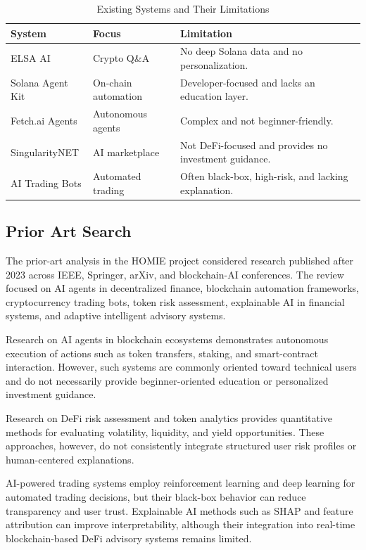 \documentclass[conference]{IEEEtran}
\begin{document}
\begin{table}[t]
\caption{Existing Systems and Their Limitations}
\label{tab:existing}
\centering
\small
\begin{tabularx}{\columnwidth}{l l X}
\toprule
\textbf{System} & \textbf{Focus} & \textbf{Limitation}\\
\midrule
ELSA AI & Crypto Q\&A & No deep Solana data and no personalization.\\
Solana Agent Kit & On-chain automation & Developer-focused and lacks an education layer.\\
Fetch.ai Agents & Autonomous agents & Complex and not beginner-friendly.\\
SingularityNET & AI marketplace & Not DeFi-focused and provides no investment guidance.\\
AI Trading Bots & Automated trading & Often black-box, high-risk, and lacking explanation.\\
\bottomrule
\end{tabularx}
\end{table}

\subsection{Prior Art Search}

The prior-art analysis in the HOMIE project considered research published after 2023 across IEEE, Springer, arXiv, and blockchain-AI conferences. The review focused on AI agents in decentralized finance, blockchain automation frameworks, cryptocurrency trading bots, token risk assessment, explainable AI in financial systems, and adaptive intelligent advisory systems.

Research on AI agents in blockchain ecosystems demonstrates autonomous execution of actions such as token transfers, staking, and smart-contract interaction. However, such systems are commonly oriented toward technical users and do not necessarily provide beginner-oriented education or personalized investment guidance.

Research on DeFi risk assessment and token analytics provides quantitative methods for evaluating volatility, liquidity, and yield opportunities. These approaches, however, do not consistently integrate structured user risk profiles or human-centered explanations.

AI-powered trading systems employ reinforcement learning and deep learning for automated trading decisions, but their black-box behavior can reduce transparency and user trust. Explainable AI methods such as SHAP and feature attribution can improve interpretability, although their integration into real-time blockchain-based DeFi advisory systems remains limited.
\end{document}
